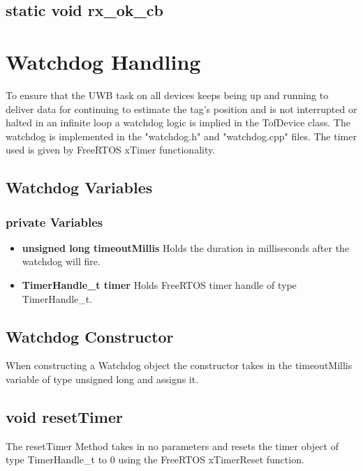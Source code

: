 \subsection{static void rx\_ok\_cb}
\label{subsec:TofResponder_rx_ok_cb}


\section{Watchdog Handling}
\label{sec:Watchdog_Handling}
To ensure that the UWB task on all devices keeps being up and running to deliver data for continuing to estimate the tag's position and is not interrupted or halted in an infinite loop a watchdog logic is implied in the TofDevice class. 
The watchdog is implemented in the "watchdog.h" and "watchdog.cpp" files. 
The timer used is given by FreeRTOS xTimer functionality. 

\subsection{Watchdog Variables}
\label{subsec:Watchdog_Variables}

\subsubsection{private Variables}
\begin{itemize}
	\item \textbf{unsigned long timeoutMillis}
	\newline
	Holds the duration in milliseconds after the watchdog will fire. 
	\item \textbf{TimerHandle\_t timer}
	\newline
	Holds FreeRTOS timer handle of type TimerHandle\_t. 
\end{itemize}

\subsection{Watchdog Constructor}
\label{subsec:Watchdog_Constructor}
When constructing a Watchdog object the constructor takes in the timeoutMillis variable of type unsigned long and assigns it. 

\subsection{void resetTimer}
\label{subsec:Watchdog_resetTimer}
The resetTimer Method takes in no parameters and resets the timer object of type TimerHandle\_t to 0 using the FreeRTOS xTimerReset function. 

